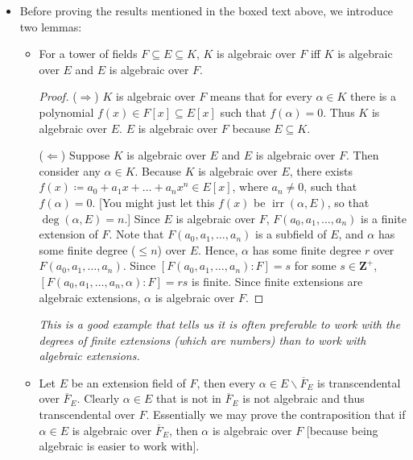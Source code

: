 \documentclass[11pt]{article}
\newcommand{\Z}{\mathbf{Z}}
\newcommand{\irr}{\operatorname{irr}}
\newcommand{\clos}[1]{\overline{#1}}
\renewcommand{\implies}{\Rightarrow}
\renewcommand{\impliedby}{\Leftarrow}
\begin{document}
\begin{itemize}
    \item Before proving the results mentioned in the boxed text above, we introduce two lemmas:
    \begin{itemize}
        \item For a tower of fields $F \subseteq E \subseteq K$, $K$ is algebraic over $F$ iff $K$ is algebraic over $E$ and $E$ is algebraic over $F$.
        \begin{proof}
            ($\implies$) $K$ is algebraic over $F$ means that for every $\alpha \in K$ there is a polynomial $f(x) \in F[x] \subseteq E[x]$ such that $f(\alpha) = 0$. Thus $K$ is algebraic over $E$. $E$ is algebraic over $F$ because $E \subseteq K$.

            ($\impliedby$) Suppose $K$ is algebraic over $E$ and $E$ is algebraic over $F$. Then consider any $\alpha \in K$. Because $K$ is algebraic over $E$, there exists $f(x) \coloneqq a_0 + a_1x + \dots + a_n x^n \in E[x]$, where $a_n \neq 0$, such that $f(\alpha) = 0$. [You might just let this $f(x)$ be $\irr(\alpha,E)$, so that $\deg(\alpha,E) = n$.] Since $E$ is algebraic over $F$, $F(a_0,a_1,\dots,a_n)$ is a finite extension of $F$. Note that $F(a_0,a_1,\dots,a_n)$ is a subfield of $E$, and $\alpha$ has some finite degree ($\leq n$) over $E$. Hence, $\alpha$ has some finite degree $r$ over $F(a_0,a_1,\dots,a_n)$. Since $[F(a_0,a_1,\dots,a_n):F] = s$ for some $s \in \Z^+$, $[F(a_0,a_1,\dots,a_n,\alpha):F] = rs$ is finite. Since finite extensions are algebraic extensions, $\alpha$ is algebraic over $F$.
        \end{proof}
        \emph{This is a good example that tells us it is often preferable to work with the degrees of finite extensions (which are numbers) than to work with algebraic extensions.}
        \item Let $E$ be an extension field of $F$, then every $\alpha \in E\backslash \clos{F}_E$ is transcendental over $\clos{F}_E$. Clearly $\alpha \in E$ that is not in $\clos{F}_E$ is not algebraic and thus transcendental over $F$. Essentially we may prove the contraposition that if $\alpha \in E$ is algebraic over $\clos{F}_E$, then $\alpha$ is algebraic over $F$ [because being algebraic is easier to work with].
        

\end{itemize}
\end{itemize}
\end{document}

